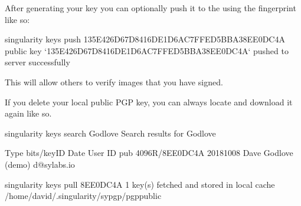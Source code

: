 \documentclass[letterpaper,10pt,english]{sphinxmanual}
\begin{document}
After generating your key you can optionally push it to the 
using the fingerprint like so:

%
\begin{sphinxVerbatim}[commandchars=\\\{\}]
\PYGZdl{} singularity keys push 135E426D67D8416DE1D6AC7FFED5BBA38EE0DC4A
public key {}`135E426D67D8416DE1D6AC7FFED5BBA38EE0DC4A{}` pushed to server successfully
\end{sphinxVerbatim}

This will allow others to verify images that you have signed.

If you delete your local public PGP key, you can always locate and download it
again like so.

%
\begin{sphinxVerbatim}[commandchars=\\\{\}]
\PYGZdl{} singularity keys search Godlove
Search results for \PYGZsq{}Godlove\PYGZsq{}

Type bits/keyID     Date       User ID
\PYGZhy{}\PYGZhy{}\PYGZhy{}\PYGZhy{}\PYGZhy{}\PYGZhy{}\PYGZhy{}\PYGZhy{}\PYGZhy{}\PYGZhy{}\PYGZhy{}\PYGZhy{}\PYGZhy{}\PYGZhy{}\PYGZhy{}\PYGZhy{}\PYGZhy{}\PYGZhy{}\PYGZhy{}\PYGZhy{}\PYGZhy{}\PYGZhy{}\PYGZhy{}\PYGZhy{}\PYGZhy{}\PYGZhy{}\PYGZhy{}\PYGZhy{}\PYGZhy{}\PYGZhy{}\PYGZhy{}\PYGZhy{}\PYGZhy{}\PYGZhy{}\PYGZhy{}\PYGZhy{}\PYGZhy{}\PYGZhy{}\PYGZhy{}\PYGZhy{}\PYGZhy{}\PYGZhy{}\PYGZhy{}\PYGZhy{}\PYGZhy{}\PYGZhy{}\PYGZhy{}\PYGZhy{}\PYGZhy{}\PYGZhy{}\PYGZhy{}\PYGZhy{}\PYGZhy{}\PYGZhy{}\PYGZhy{}\PYGZhy{}\PYGZhy{}\PYGZhy{}\PYGZhy{}\PYGZhy{}\PYGZhy{}\PYGZhy{}\PYGZhy{}\PYGZhy{}\PYGZhy{}\PYGZhy{}\PYGZhy{}\PYGZhy{}\PYGZhy{}\PYGZhy{}\PYGZhy{}\PYGZhy{}\PYGZhy{}\PYGZhy{}\PYGZhy{}\PYGZhy{}\PYGZhy{}\PYGZhy{}\PYGZhy{}\PYGZhy{}
pub  4096R/8EE0DC4A 2018\PYGZhy{}10\PYGZhy{}08 Dave Godlove (demo) \PYGZlt{}d@sylabs.io\PYGZgt{}
\PYGZhy{}\PYGZhy{}\PYGZhy{}\PYGZhy{}\PYGZhy{}\PYGZhy{}\PYGZhy{}\PYGZhy{}\PYGZhy{}\PYGZhy{}\PYGZhy{}\PYGZhy{}\PYGZhy{}\PYGZhy{}\PYGZhy{}\PYGZhy{}\PYGZhy{}\PYGZhy{}\PYGZhy{}\PYGZhy{}\PYGZhy{}\PYGZhy{}\PYGZhy{}\PYGZhy{}\PYGZhy{}\PYGZhy{}\PYGZhy{}\PYGZhy{}\PYGZhy{}\PYGZhy{}\PYGZhy{}\PYGZhy{}\PYGZhy{}\PYGZhy{}\PYGZhy{}\PYGZhy{}\PYGZhy{}\PYGZhy{}\PYGZhy{}\PYGZhy{}\PYGZhy{}\PYGZhy{}\PYGZhy{}\PYGZhy{}\PYGZhy{}\PYGZhy{}\PYGZhy{}\PYGZhy{}\PYGZhy{}\PYGZhy{}\PYGZhy{}\PYGZhy{}\PYGZhy{}\PYGZhy{}\PYGZhy{}\PYGZhy{}\PYGZhy{}\PYGZhy{}\PYGZhy{}\PYGZhy{}\PYGZhy{}\PYGZhy{}\PYGZhy{}\PYGZhy{}\PYGZhy{}\PYGZhy{}\PYGZhy{}\PYGZhy{}\PYGZhy{}\PYGZhy{}\PYGZhy{}\PYGZhy{}\PYGZhy{}\PYGZhy{}\PYGZhy{}\PYGZhy{}\PYGZhy{}\PYGZhy{}\PYGZhy{}\PYGZhy{}

\PYGZdl{} singularity keys pull 8EE0DC4A
1 key(s) fetched and stored in local cache /home/david/.singularity/sypgp/pgp\PYGZhy{}public
\end{sphinxVerbatim}
\end{document}
